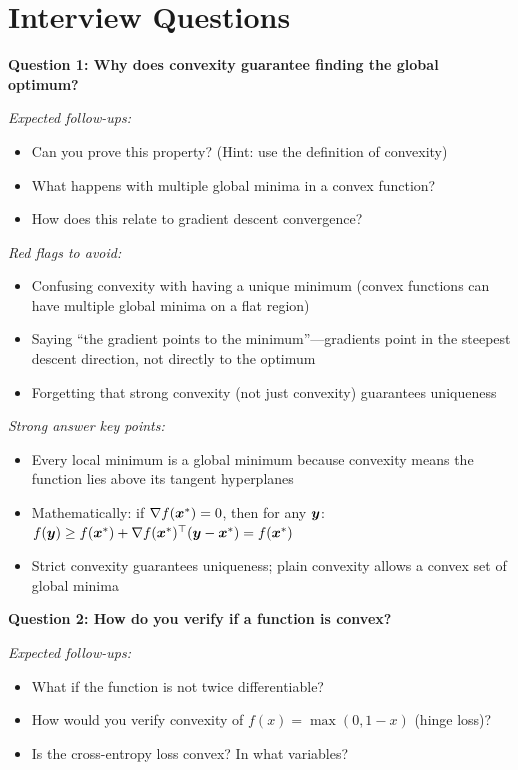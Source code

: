 \documentclass[../../main.tex]{subfiles}
\begin{document}
\section*{Interview Questions}
\begin{interviewquestions}

\textbf{Question 1: Why does convexity guarantee finding the global optimum?}

\textit{Expected follow-ups:}
\begin{itemize}
    \item Can you prove this property? (Hint: use the definition of convexity)
    \item What happens with multiple global minima in a convex function?
    \item How does this relate to gradient descent convergence?
\end{itemize}

\textit{Red flags to avoid:}
\begin{itemize}
    \item Confusing convexity with having a unique minimum (convex functions can have multiple global minima on a flat region)
    \item Saying ``the gradient points to the minimum''---gradients point in the steepest descent direction, not directly to the optimum
    \item Forgetting that strong convexity (not just convexity) guarantees uniqueness
\end{itemize}

\textit{Strong answer key points:}
\begin{itemize}
    \item Every local minimum is a global minimum because convexity means the function lies above its tangent hyperplanes
    \item Mathematically: if $\nabla f(\boldsymbol{x}^*) = 0$, then for any $\boldsymbol{y}$: $f(\boldsymbol{y}) \geq f(\boldsymbol{x}^*) + \nabla f(\boldsymbol{x}^*)^\top(\boldsymbol{y} - \boldsymbol{x}^*) = f(\boldsymbol{x}^*)$
    \item Strict convexity guarantees uniqueness; plain convexity allows a convex set of global minima
\end{itemize}

\vspace{0.5em}
\textbf{Question 2: How do you verify if a function is convex?}

\textit{Expected follow-ups:}
\begin{itemize}
    \item What if the function is not twice differentiable?
    \item How would you verify convexity of $f(x) = \max(0, 1-x)$ (hinge loss)?
    \item Is the cross-entropy loss convex? In what variables?
\end{itemize}


\end{interviewquestions}
\end{document}
